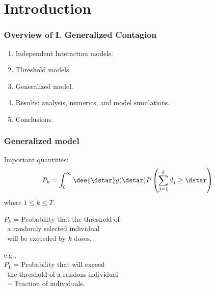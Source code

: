 \section{Introduction}

\begin{frame}
  \frametitle{Overview of I. Generalized Contagion}

  \begin{enumerate}
  \item Independent Interaction models.
  \item Threshold models.
  \item Generalized model.
  \item Results: analysis, numerics, and model simulations.
  \item Conclusions.
  \end{enumerate}

\end{frame}



\begin{frame}
  \frametitle{Generalized model}

  Important quantities:
  $$  
  P_k
  =
  \int_{0}^{\infty} \dee{\dstar}
  g(\dstar)
  P\left(
    \sum_{j=1}^{k} d_j \ge \dstar
    \right)
  $$
  where $1 \le k \le T$.

  $P_k$ = Probability that the threshold of \\
\quad \quad \  a randomly selected individual\\
\quad \quad \  will be exceeded by $k$ doses.

e.g., \\
$P_1$ = Probability that \underline{} will exceed\\
\quad \quad \ the threshold of a random individual\\
\ \quad  = Fraction of \underline{} individuals.

\end{frame}

